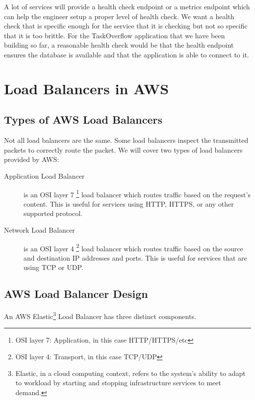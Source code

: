 \documentclass{csse4400}
\begin{document}
A lot of services will provide a health check endpoint or a metrics endpoint which can help the engineer setup a proper level of health check.
We want a health check that is specific enough for the service that it is checking but not so specific that it is too brittle.
For the TaskOverflow application that we have been building so far,
a reasonable health check would be that the health endpoint ensures the database is available and that the application is able to connect to it.

\section{Load Balancers in AWS}

\subsection{Types of AWS Load Balancers}
Not all load balancers are the same.
Some load balancers inspect the transmitted packets to correctly route the packet.
We will cover two types of load balancers provided by AWS:

\begin{description}
  \item[Application Load Balancer] is an OSI layer 7%
\footnote{OSI layer 7: Application, in this case HTTP/HTTPS/etc}
load balancer which routes traffic based on the request's content.
      This is useful for services using HTTP, HTTPS, or any other supported protocol.
  \item[Network Load Balancer] is an OSI layer 4%
\footnote{OSI layer 4: Transport, in this case TCP/UDP}
load balancer which routes traffic based on the source and destination IP addresses and ports.
This is useful for services that are using TCP or UDP.
\end{description}

\subsection{AWS Load Balancer Design}

An AWS Elastic\footnote{Elastic, in a cloud computing context, refers to the system's ability to adapt to workload by starting and stopping infrastructure services to meet demand.} Load Balancer has three distinct components. 
\end{document}
